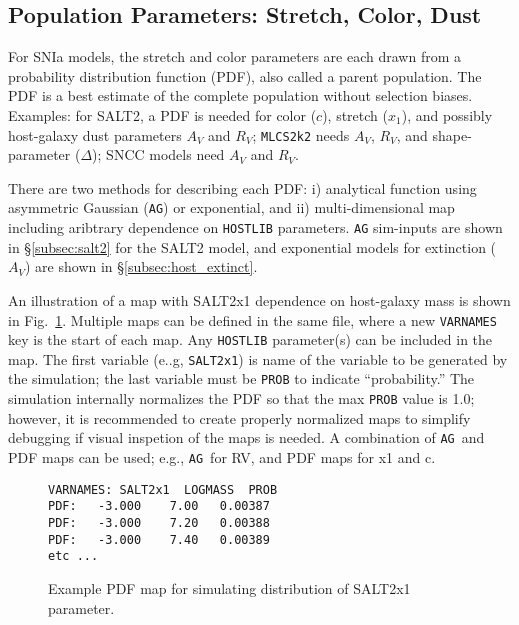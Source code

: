 \documentclass[12pt]{article}
\newcommand{\mlcs}{{\tt MLCS2k2}}
\begin{document}
   \subsection{Population Parameters: Stretch, Color, Dust}
   \label{subsec:genPDF}
\newcommand{\AG}{{\tt AG}}

For SNIa models, the stretch and color parameters are each drawn from a
probability distribution function (PDF), also called a parent population.
The PDF is a best estimate of the complete population without selection
biases. Examples: 
for SALT2, a PDF is needed for color ($c$), stretch ($x_1$),
and possibly host-galaxy dust parameters $A_V$ and $R_V$;
{\mlcs} needs $A_V$, $R_V$, and shape-parameter ($\Delta$);
SNCC models need $A_V$ and $R_V$.

There are two methods for describing each PDF:
i) analytical function using asymmetric Gaussian (\AG) or exponential, and
ii) multi-dimensional map including aribtrary dependence on
{\tt HOSTLIB} parameters.
{\AG} sim-inputs are shown in \S\ref{subsec:salt2} for the SALT2 model,
and exponential models for extinction ($A_V$)
are shown in \S\ref{subsec:host_extinct}.

An illustration of a map with SALT2x1 dependence on host-galaxy mass
is shown in Fig.~\ref{fig:genpdf_file}. Multiple maps can be defined
in the same file, where a new {\tt VARNAMES} key is the start
of each map. Any {\tt HOSTLIB} parameter(s) can be included in the map.
The first variable (e..g, {\tt SALT2x1}) is name of the variable
to be generated by the simulation; the last variable must be {\tt PROB}
to indicate ``probability.'' The simulation internally normalizes the
PDF so that the max {\tt PROB} value is 1.0; however, it is recommended
to create properly normalized maps to simplify debugging if visual
inspetion of the maps is needed.
A combination of \AG\ and PDF maps can be used;
e.g., \AG\ for RV, and PDF maps for x1 and c. 

\begin{figure} [ht] 
\begin{center}
\begin{Verbatim}[frame=single]
VARNAMES: SALT2x1  LOGMASS  PROB 
PDF:   -3.000    7.00   0.00387 
PDF:   -3.000    7.20   0.00388
PDF:   -3.000    7.40   0.00389 
etc ...
\end{Verbatim}
\end{center}
\vspace{-0.8cm}
\caption{
  Example PDF map for simulating distribution of SALT2x1 parameter.
 }
\label{fig:genpdf_file}
\end{figure}
\end{document}

